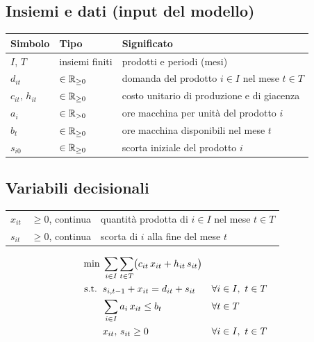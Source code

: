 \subsection*{Insiemi e dati (input del modello)}
\begin{center}\small
\begin{tabular}{llp{7.6cm}}
\toprule
Simbolo & Tipo & Significato \\
\midrule
$I$, $T$ & insiemi finiti & prodotti e periodi (mesi) \\
$d_{it}$ & $\in \mathbb{R}_{\ge 0}$ & domanda del prodotto $i \in I$ nel mese $t \in T$ \\
$c_{it},\, h_{it}$ & $\in \mathbb{R}_{\ge 0}$ & costo unitario di produzione e di giacenza \\
$a_i$ & $\in \mathbb{R}_{> 0}$ & ore macchina per unità del prodotto $i$ \\
$b_t$ & $\in \mathbb{R}_{\ge 0}$ & ore macchina disponibili nel mese $t$ \\
$s_{i0}$ & $\in \mathbb{R}_{\ge 0}$ & scorta iniziale del prodotto $i$ \\
\bottomrule
\end{tabular}
\end{center}

\subsection*{Variabili decisionali}
\begin{center}\small
\begin{tabular}{llp{7.6cm}}
\toprule
$x_{it}$ & $\ge 0$, continua & quantità prodotta di $i \in I$ nel mese $t \in T$ \\
$s_{it}$ & $\ge 0$, continua & scorta di $i$ alla fine del mese $t$ \\
\bottomrule
\end{tabular}
\end{center}

\begin{modello}
\begin{align}
\min\;& \sum_{i \in I}\sum_{t \in T} \bigl( c_{it}\, x_{it} + h_{it}\, s_{it} \bigr) \notag\\
\text{s.t.}\;\;
& s_{i,t-1} + x_{it} = d_{it} + s_{it} && \forall i \in I,\ t \in T \label{eq:bilancio}\\
& \sum_{i \in I} a_i\, x_{it} \le b_t && \forall t \in T \label{eq:capacita}\\
& x_{it},\, s_{it} \ge 0 && \forall i \in I,\ t \in T \notag
\end{align}
\end{modello}


